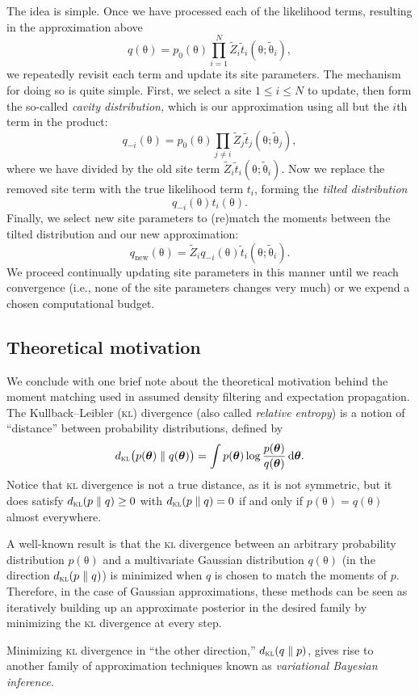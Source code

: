 \documentclass{article}
\newcommand{\acro}[1]{\textsc{\MakeLowercase{#1}}}
\newcommand{\intd}[1]{\,\mathrm{d}{#1}}
\renewcommand{\vec}[1]{\bm{\mathrm{#1}}}
\begin{document}
The idea is simple.  Once we have processed each of the likelihood
terms, resulting in the approximation above
\[
  q(\vec{\theta})
  =
  p_0(\vec{\theta})
  \prod_{i = 1}^N \tilde{Z}_i \tilde{t}_i(\vec{\theta}; \tilde{\vec{\theta}}_i),
\]
we repeatedly revisit each term and update its site parameters.  The
mechanism for doing so is quite simple.  First, we select a site $1
\leq i \leq N$ to update, then form the so-called \emph{cavity
  distribution,} which is our approximation using all but the $i$th
term in the product:
\[
  q_{-i}(\vec{\theta})
  =
  p_0(\vec{\theta})
  \prod_{j \neq i} \tilde{Z}_j \tilde{t}_j(\vec{\theta}; \tilde{\vec{\theta}}_j),
\]
where we have divided by the old site term $\tilde{Z}_i
\tilde{t}_i(\vec{\theta}; \tilde{\vec{\theta}}_i)$.  Now we replace
the removed site term with the true likelihood term $t_i$, forming the
\emph{tilted distribution}
\[
  q_{-i}(\vec{\theta})
  t_i(\vec{\theta}).
\]
Finally, we select new site parameters to (re)match the moments
between the tilted distribution and our new approximation:
\[
  q_{\text{new}}(\vec{\theta})
  =
  \tilde{Z}_i
  q_{-i}(\vec{\theta})
  \tilde{t}_i(\vec{\theta}; \tilde{\vec{\theta}}_i).
\]
We proceed continually updating site parameters in this manner until
we reach convergence (i.e., none of the site parameters changes very
much) or we expend a chosen computational budget.

\subsection*{Theoretical motivation}

We conclude with one brief note about the theoretical motivation
behind the moment matching used in assumed density filtering and
expectation propagation.  The Kullback--Leibler (\acro{KL}) divergence
(also called \emph{relative entropy}) is a notion of ``distance''
between probability distributions, defined by
\[
d_{\text{\acro{KL}}}\bigl(p(\vec{\theta}) \parallel q(\vec{\theta})\bigr)
  =
  \int
  p(\vec{\theta})
  \log
  \frac{p(\vec{\theta})}{q(\vec{\theta})}
  \intd{\vec{\theta}}.
\]
Notice that \acro{KL} divergence is not a true distance, as it is not
symmetric, but it does satisfy $d_{\text{\acro{KL}}}(p \parallel q)
\geq 0$ with $d_{\text{\acro{KL}}}(p \parallel q) = 0$ if and only if
$p(\vec{\theta}) = q(\vec{\theta})$ almost everywhere.

A well-known result is that the \acro{KL} divergence between an
arbitrary probability distribution $p(\vec{\theta})$ and a
multivariate Gaussian distribution $q(\vec{\theta})$ (in the direction
$d_{\text{\acro{KL}}}(p \parallel q)$) is minimized when $q$ is chosen
to match the moments of $p$.  Therefore, in the case of Gaussian
approximations, these methods can be seen as iteratively building up
an approximate posterior in the desired family by minimizing the
\acro{KL} divergence at every step.

Minimizing \acro{KL} divergence in ``the other direction,''
$d_{\text{\acro{KL}}}(q \parallel p)$, gives rise to another family of
approximation techniques known as \emph{variational Bayesian
  inference.}
\end{document}
